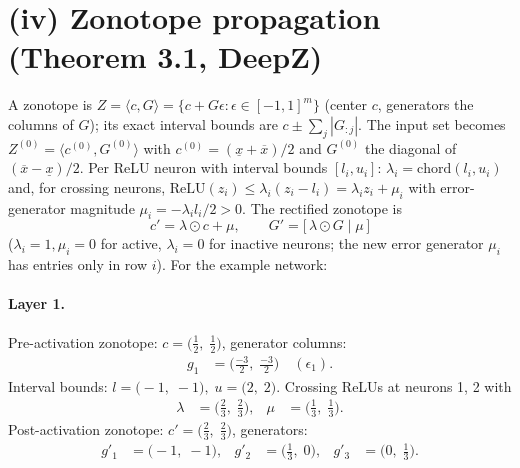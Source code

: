 \documentclass[11pt]{article}
\begin{document}
\section{(iv) Zonotope propagation (Theorem 3.1, DeepZ)}
A zonotope is $Z = \langle c, G \rangle = \{c + G\epsilon : \epsilon \in [-1,1]^m\}$
(center $c$, generators the columns of $G$); its exact interval bounds are
$c \pm \sum_j |G_{:j}|$. The input set becomes $Z^{(0)} = \langle c^{(0)}, G^{(0)} \rangle$ with
$c^{(0)} = (\underline{x} + \overline{x})/2$ and $G^{(0)}$ the diagonal of $(\overline{x} - \underline{x})/2$.
Per ReLU neuron with interval bounds $[l_i, u_i]$:
$\lambda_i = \mathrm{chord}(l_i, u_i)$ and, for crossing neurons,
$\mathrm{ReLU}(z_i) \le \lambda_i (z_i - l_i) = \lambda_i z_i + \mu_i$ with error-generator magnitude
$\mu_i = -\lambda_i l_i / 2 > 0$. The rectified zonotope is
\begin{equation*}
c' = \lambda \odot c + \mu, \qquad G' = \bigl[\, \lambda \odot G \;\big|\; \mu\, \bigr]
\end{equation*}
($\lambda_i = 1, \mu_i = 0$ for active, $\lambda_i = 0$ for inactive neurons;
the new error generator $\mu_i$ has entries only in row $i$).
For the example network:
\paragraph{Layer 1.}
Pre-activation zonotope: $c = \bigl(\frac{1}{2},\; \frac{1}{2}\bigr)$, generator columns:
\begin{align*}
g_{1} &= \bigl(\frac{-3}{2},\; \frac{-3}{2}\bigr) \quad (\epsilon_{1}).
\end{align*}
Interval bounds: $l = \bigl(-1,\; -1\bigr), \; u = \bigl(2,\; 2\bigr)$. 
Crossing ReLUs at neurons 1, 2 with
\begin{align*}
\lambda &= \bigl(\frac{2}{3},\; \frac{2}{3}\bigr), & \mu &= \bigl(\frac{1}{3},\; \frac{1}{3}\bigr).
\end{align*}
Post-activation zonotope: $c' = \bigl(\frac{2}{3},\; \frac{2}{3}\bigr)$, generators:
\begin{align*}
g'_{1} &= \bigl(-1,\; -1\bigr), &
g'_{2} &= \bigl(\frac{1}{3},\; 0\bigr), &
g'_{3} &= \bigl(0,\; \frac{1}{3}\bigr).
\end{align*}
\end{document}

